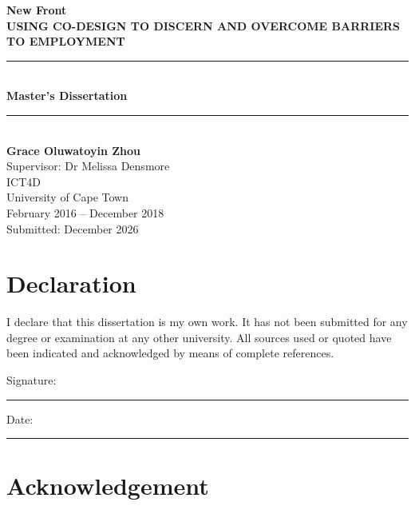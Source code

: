 \documentclass[12pt,a4paper,oneside]{report}
\begin{document}

\begin{titlepage}
    \centering
    \vspace*{2cm}

    {\Large\bfseries New Front \\ USING CO-DESIGN TO DISCERN AND OVERCOME BARRIERS TO EMPLOYMENT}\\[1.5cm]

    \rule{\textwidth}{0.4pt}\\[0.5cm]
    \textbf{Master’s Dissertation}\\
    \rule{\textwidth}{0.4pt}\\[1.5cm]

    \textbf{Grace Oluwatoyin Zhou}\\[1cm]

    Supervisor: Dr Melissa Densmore\\[0.5cm]

    ICT4D\\
    University of Cape Town\\[1cm]

    February 2016 -- December 2018\\
    Submitted: December 2026

    \vfill

\end{titlepage}


\chapter*{Declaration}

I declare that this dissertation is my own work. It has not been submitted for any degree or examination at any other university. All sources used or quoted have been indicated and acknowledged by means of complete references.

\vspace{1.5cm}

Signature: \rule{6cm}{0.4pt}

Date: \rule{6cm}{0.4pt}


\chapter*{Acknowledgement}
\end{document}

